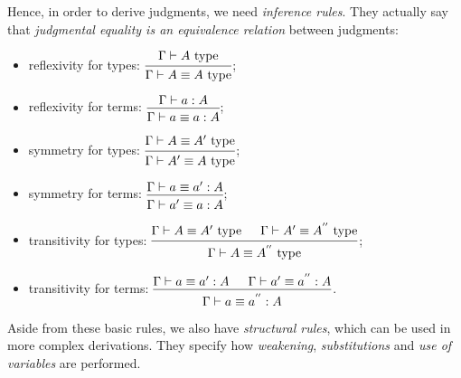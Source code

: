 Hence, in order to derive judgments, we need \emph{inference rules}.
They actually say that  \emph{judgmental equality is %
  an equivalence relation} between judgments:
\begin{itemize}
\item reflexivity for types:
  $ \begin{prooftree}
    \hypo{\Gamma \vdash A \text{ type}}
    \infer1{\Gamma \vdash A \equiv A \text{ type}}
  \end{prooftree}
  $;
\item reflexivity for terms:
  $ \begin{prooftree}
    \hypo{\Gamma \vdash a : A}
    \infer1{\Gamma \vdash a \equiv a : A}
  \end{prooftree}
  $;
\item symmetry for types:
  $ \begin{prooftree}
    \hypo{\Gamma \vdash A \equiv A' \text{ type}}
    \infer1{\Gamma \vdash A' \equiv A \text{ type}}
  \end{prooftree}
  $;
\item symmetry for terms:
  $ \begin{prooftree}
    \hypo{\Gamma \vdash a \equiv a' : A}
    \infer1{\Gamma \vdash a' \equiv a : A}
  \end{prooftree}
  $;
\item transitivity for types:
  $ \begin{prooftree}
    \hypo{\Gamma \vdash A \equiv A' \text{ type}}
    \hypo{\Gamma \vdash A' \equiv A^{''} \text{ type}}
    \infer2{\Gamma \vdash A \equiv A^{''} \text{ type}}
  \end{prooftree}
  $;
\item transitivity for terms:
  $ \begin{prooftree}
    \hypo{\Gamma \vdash a \equiv a' : A}
    \hypo{\Gamma \vdash a' \equiv a^{''} : A}
    \infer2{\Gamma \vdash a \equiv a^{''} : A}
  \end{prooftree}
  $.
\end{itemize}

Aside from these basic rules, we also have \emph{structural rules}, which
can be used in more complex derivations. They specify how \emph{weakening},
\emph{substitutions} and \emph{use of variables} are performed.

